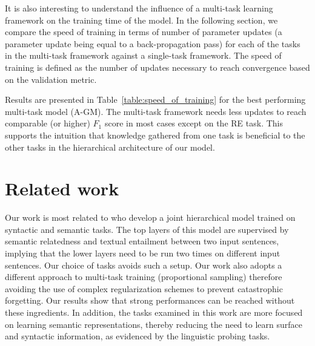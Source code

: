 \documentclass[letterpaper]{article}
\begin{document}
It is also interesting to understand the influence of a multi-task learning framework on the training time of the model. In the following section, we compare the speed of training in terms of number of parameter updates (a parameter update being equal to a back-propagation pass) for each of the tasks in the multi-task framework against a single-task framework. The speed of training is defined as the number of updates necessary to reach convergence based on the validation metric.

Results are presented in Table~\ref{table:speed_of_training} for the best performing multi-task model (A-GM). The multi-task framework needs less updates to reach comparable (or higher) $F_{1}$ score in most cases except on the RE task. This supports the intuition that knowledge gathered from one task is beneficial to the other tasks in the hierarchical architecture of our model.

\begin{table}
\centering
\caption{Speed of training: Difference in number of updates necessary before convergence: Multi-task (Full Model: A-GM) compared to single task. We report the differences in $F_{1}$ performance. Lower time is better, higher performance is better.}
\label{table:speed_of_training}
\end{table}



\section{Related work}

Our work is most related to \citeauthor{Hashimoto2017}  who develop a joint hierarchical model trained on syntactic and semantic tasks. The top layers of this model are supervised by semantic relatedness and textual entailment between two input sentences, implying that the lower layers need to be run two times on different input sentences. Our choice of tasks avoids such a setup. Our work also adopts a different approach to multi-task training (proportional sampling) therefore avoiding the use of complex regularization schemes to prevent catastrophic forgetting. Our results show that strong performances can be reached without these ingredients. In addition, the tasks examined in this work are more focused on learning semantic representations, thereby reducing the need to learn surface and syntactic information, as evidenced by the linguistic probing tasks.
\end{document}
